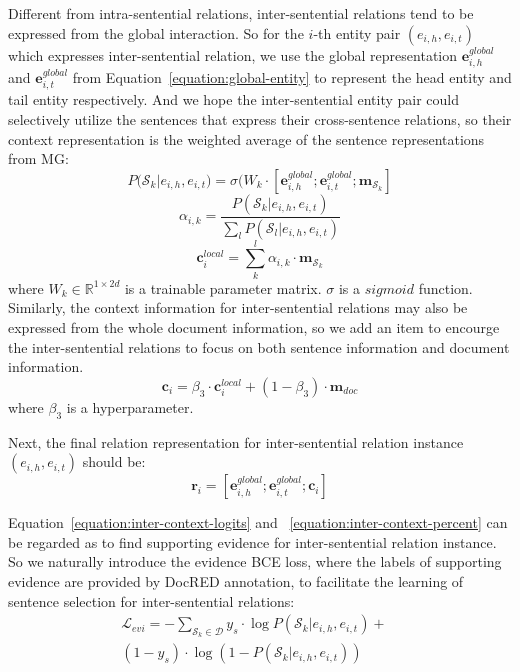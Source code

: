 \documentclass[11pt,a4paper]{article}
\begin{document}
Different from intra-sentential relations, inter-sentential relations tend to be expressed from the global interaction. So for the $i$-th entity pair $(e_{i,h}, e_{i,t})$ which expresses inter-sentential relation, we use the global representation $\textbf{e}^{global}_{i,h}$ and $\textbf{e}^{global}_{i,t}$ from Equation~\ref{equation:global-entity} to represent the head entity and tail entity respectively. And we hope the inter-sentential entity pair could selectively utilize the sentences that express their cross-sentence relations, so their context representation is the weighted average of the sentence representations from MG:
\begin{equation}
P({\mathcal{S}_{k}|e_{i,h},e_{i,t})} = \sigma (W_k \cdot [\textbf{e}^{global}_{i,h}; \textbf{e}^{global}_{i,t}; \textbf{m}_{\mathcal{S}_{k}}]
\label{equation:inter-context-logits}
\end{equation}
\begin{equation}
    \alpha_{i,k} = \frac{P(\mathcal{S}_{k}|e_{i,h},e_{i,t})}{\sum_{l}P(\mathcal{S}_{l}|e_{i,h},e_{i,t})}
    \label{equation:inter-context-percent}
\end{equation}
\begin{equation}
    \textbf{c}^{local}_{i} = \sum^{l}_{k}\alpha_{i,k} \cdot \textbf{m}_{\mathcal{S}_{k}}
\end{equation}
where $W_k\in \mathbb{R}^{1 \times 2d}$ is a trainable parameter matrix. $\sigma$ is a $sigmoid$ function. 
Similarly, the context information for inter-sentential relations may also be expressed from the whole document information, so we add an item to encourge the inter-sentential relations to focus on both sentence information and document information.
\begin{equation}
\textbf{c}_{i} = 
\beta_{3} \cdot \textbf{c}^{local}_{i} + (1 - \beta_{3}) \cdot \textbf{m}_{doc}
\end{equation}
where $\beta_{3}$ is a hyperparameter.

Next, the final relation representation for inter-sentential relation instance $(e_{i,h}, e_{i,t})$ should be:
\begin{equation}
\textbf{r}_{i} = [\textbf{e}^{global}_{i,h}; \textbf{e}^{global}_{i,t}; \textbf{c}_{i}]
\end{equation}

Equation~\ref{equation:inter-context-logits} and ~\ref{equation:inter-context-percent} can be regarded as to find supporting evidence for inter-sentential relation instance. So we naturally introduce the evidence BCE loss, where the labels of supporting evidence are provided by DocRED annotation, to facilitate the learning of sentence selection for inter-sentential relations:
\begin{equation}
    \begin{aligned}
    \mathcal{L}_{evi} = -\sum_{\mathcal{S}_k\in \mathcal{D}} y_s \cdot \log P(\mathcal{S}_{k}|e_{i,h},e_{i,t}) + & \\ (1 - y_s) \cdot \log (1 - P(\mathcal{S}_{k}|e_{i,h},e_{i,t}))
    \end{aligned}
\end{equation}
\end{document}
